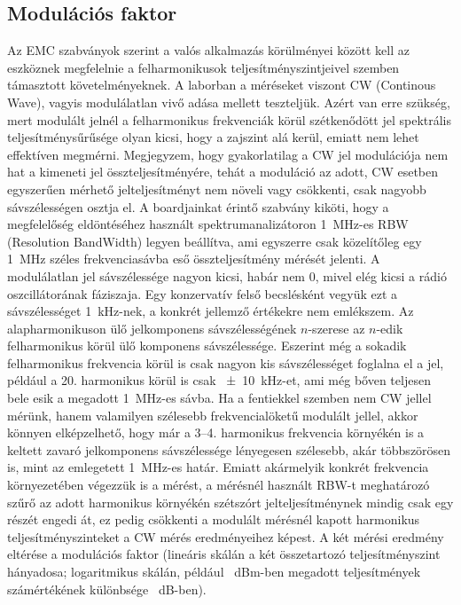 \documentclass[a4paper,12pt,titlepage]{article}
\begin{document}
        \subsection{Modulációs faktor}
            Az EMC szabványok szerint a valós alkalmazás körülményei között kell az eszköznek megfelelnie a felharmonikusok teljesítményszintjeivel szemben támasztott követelményeknek. A laborban a méréseket viszont CW (Continous Wave), vagyis modulálatlan vivő adása mellett teszteljük. Azért van erre szükség, mert modulált jelnél a felharmonikus frekvenciák körül szétkenődött jel spektrális teljesítménysűrűsége olyan kicsi, hogy a zajszint alá kerül, emiatt nem lehet effektíven megmérni. Megjegyzem, hogy gyakorlatilag a CW jel modulációja nem hat a kimeneti jel összteljesítményére, tehát a moduláció az adott, CW esetben egyszerűen mérhető jelteljesítményt nem növeli vagy csökkenti, csak nagyobb sávszélességen osztja el. A boardjainkat érintő szabvány kiköti, hogy a megfelelőség eldöntéséhez használt spektrumanalizátoron \SI{1}{MHz}-es RBW (Resolution BandWidth) legyen beállítva, ami egyszerre csak közelítőleg egy \SI{1}{MHz} széles frekvenciasávba eső összteljesítmény mérését jelenti. A modulálatlan jel sávszélessége nagyon kicsi, habár nem 0, mivel elég kicsi a rádió oszcillátorának fáziszaja. Egy konzervatív felső becslésként vegyük ezt a sávszélességet \SI{1}{kHz}-nek, a konkrét jellemző értékekre nem emlékszem. Az alapharmonikuson ülő jelkomponens sávszélességének $n$-szerese az $n$-edik felharmonikus körül ülő komponens sávszélessége. Eszerint még a sokadik felharmonikus frekvencia körül is csak nagyon kis sávszélességet foglalna el a jel, például a 20. harmonikus körül is csak \SI{\pm10}{kHz}-et, ami még bőven teljesen bele esik a megadott \SI{1}{MHz}-es sávba. Ha a fentiekkel szemben nem CW jellel mérünk, hanem valamilyen szélesebb frekvencialöketű modulált jellel, akkor könnyen elképzelhető, hogy már a 3--4. harmonikus frekvencia környékén is a keltett zavaró jelkomponens sávszélessége lényegesen szélesebb, akár többszörösen is, mint az emlegetett \SI{1}{MHz}-es határ. Emiatt akármelyik konkrét frekvencia környezetében végezzük is a mérést, a mérésnél használt RBW-t meghatározó szűrő az adott harmonikus környékén szétszórt jelteljesítménynek mindig csak egy részét engedi át, ez pedig csökkenti a modulált mérésnél kapott harmonikus teljesítményszinteket a CW mérés eredményeihez képest. A két mérési eredmény eltérése a modulációs faktor (lineáris skálán a két összetartozó teljesítményszint hányadosa; logaritmikus skálán, például \SI{}{dBm}-ben megadott teljesítmények számértékének különbsége \SI{}{dB}-ben).
\end{document}
